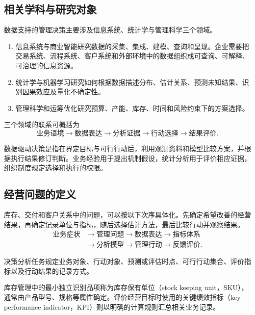 \subsection{相关学科与研究对象}

数据支持的管理决策主要涉及信息系统、统计学与管理科学三个领域。

\begin{enumerate}
  \item 信息系统与商业智能研究数据的采集、集成、建模、查询和呈现。企业需要把交易系统、流程系统、客户系统和外部环境中的数据组织成可查询、可解释、可治理的信息资源。
  \item 统计学与机器学习研究如何根据数据描述分布、估计关系、预测未知结果、识别因果效应及量化不确定性。
  \item 管理科学和运筹优化研究预算、产能、库存、时间和风险约束下的方案选择。
\end{enumerate}

三个领域的联系可概括为
\[
\text{业务语境}
\rightarrow
\text{数据表达}
\rightarrow
\text{分析证据}
\rightarrow
\text{行动选择}
\rightarrow
\text{结果评价}.
\]

数据驱动决策是指在界定目标与可行行动后，利用观测资料和模型比较方案，并根据执行结果修订判断。业务经验用于提出机制假设，统计分析用于评价相应证据，组织制度规定选择和执行的权限。

\subsection{经营问题的定义}

库存、交付和客户关系中的问题，可以按以下次序具体化。先确定希望改善的经营结果，再确定记录单位与指标，随后选择估计方法，最后比较行动并观察结果。
\[
\begin{aligned}
\text{业务症状}
&\longrightarrow
\text{管理问题}
\longrightarrow
\text{数据表达}
\longrightarrow
\text{指标体系}\\
&\longrightarrow
\text{分析模型}
\longrightarrow
\text{管理行动}
\longrightarrow
\text{反馈评价}.
\end{aligned}
\]

\begin{definition}[决策分析任务]
决策分析任务规定业务对象、行动对象、预测或评估时点、可行行动集合、评价指标以及行动结果的记录方式。
\end{definition}

库存管理中的最小独立识别品项称为库存保有单位（stock keeping unit，SKU），通常由产品型号、规格等属性确定。评价经营目标时使用的关键绩效指标（key performance indicator，KPI）则以明确的计算规则汇总相关业务记录。


